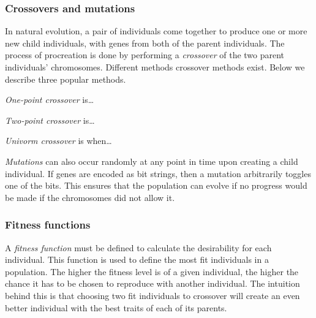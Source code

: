 
\subsubsection{Crossovers and mutations}
In natural evolution, a pair of individuals come together to produce one or more new child individuals, with genes from both of the parent individuals. The process of procreation is done by performing a \emph{crossover} of the two parent individuals' chromosomes. Different methods crossover methods exist. Below we describe three popular methods.

\emph{One-point crossover} is\ldots

\emph{Two-point crossover} is\ldots

\emph{Univorm crossover} is when\ldots




\emph{Mutations} can also occur randomly at any point in time upon creating a child individual. If genes are encoded as bit strings, then a mutation arbitrarily toggles one of the bits. This ensures that the population can evolve if no progress would be made if the chromosomes did not allow it.

\subsubsection{Fitness functions}
A \emph{fitness function} must be defined to calculate the desirability for each individual. This function is used to define the most fit individuals in a population. The higher the fitness level is of a given individual, the higher the chance it has to be chosen to reproduce with another individual. The intuition behind this is that choosing two fit individuals to crossover will create an even better individual with the best traits of each of its parents.

